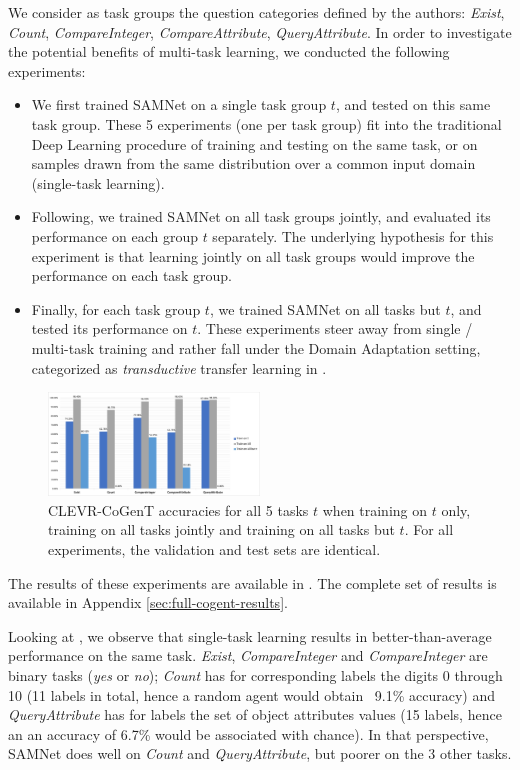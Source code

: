 We consider as task groups the question categories defined by the authors: \textit{Exist}, \textit{Count}, \textit{CompareInteger}, \textit{CompareAttribute}, \textit{QueryAttribute}. In order to investigate the potential benefits of multi-task learning, we conducted the following experiments:

\begin{itemize}
	\item We first trained SAMNet on a single task group $t$, and tested on this same task group. These 5 experiments (one per task group) fit into the traditional Deep Learning procedure of training and testing on the same task, or on samples drawn from the same distribution over a common input domain (single-task learning).
	\item Following, we trained SAMNet on all task groups jointly, and evaluated its performance on each group $t$ separately. The underlying hypothesis for this experiment is that learning jointly on all task groups would improve the performance on each task group.
	\item Finally, for each task group $t$, we trained SAMNet on all tasks but $t$, and tested its performance on $t$. These experiments steer away from single / multi-task training and rather fall under the Domain Adaptation setting, categorized as \emph{transductive} transfer learning in \cite{pan2009survey}.
\end{itemize}

\begin{figure}[!t]
	\centering
	\includegraphics[width=0.5\textwidth]{img/results/CoGenT_results.pdf}
	\caption{CLEVR-CoGenT accuracies for all 5 tasks $t$ when training on $t$ only, training on all tasks jointly and training on all tasks but $t$. For all experiments, the validation and test sets are identical.}
	\label{fig:CoGenT-results}
\end{figure}

The results of these experiments are available in . The complete set of results is available in Appendix \ref{sec:full-cogent-results}.


Looking at , we observe that single-task learning results in better-than-average performance on the same task. \textit{Exist}, \textit{CompareInteger} and \textit{CompareInteger} are binary tasks (\textit{yes} or \textit{no}); \textit{Count} has for corresponding labels the digits 0 through 10 (11 labels in total, hence a random agent would obtain ~9.1\% accuracy) and \textit{QueryAttribute} has for labels the set of object attributes values (15 labels, hence an an accuracy of 6.7\% would be associated with chance). In that perspective, SAMNet does well on \textit{Count} and \textit{QueryAttribute}, but poorer on the 3 other tasks.

